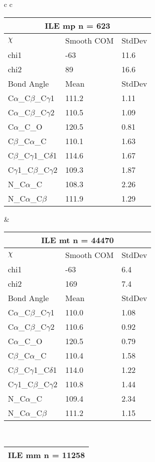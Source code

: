 \begin{longtable}{ c c }
\begin{tabular}{ l l l }
  \toprule
  \multicolumn{3}{c}{ILE \textbf{mp} n = 623} \\ \toprule
  $\chi$       & Smooth COM & StdDev \\ \midrule
  chi1 & -63 & 11.6 \\ 
  chi2 & 89 & 16.6 \\ \midrule
  Bond Angle   & Mean     & StdDev \\ \midrule
  C$\alpha$\_C$\beta$\_C$\gamma$1 & 111.2 & 1.11\\
  C$\alpha$\_C$\beta$\_C$\gamma$2 & 110.5 & 1.09\\
  C$\alpha$\_C\_O & 120.5 & 0.81\\
  C$\beta$\_C$\alpha$\_C & 110.1 & 1.63\\
  C$\beta$\_C$\gamma$1\_C$\delta$1 & 114.6 & 1.67\\
  C$\gamma$1\_C$\beta$\_C$\gamma$2 & 109.3 & 1.87\\
  N\_C$\alpha$\_C & 108.3 & 2.26\\
  N\_C$\alpha$\_C$\beta$ & 111.9 & 1.29\\
  \bottomrule
  \end{tabular}
  &
  \begin{tabular}{ l l l }
  \toprule
  \multicolumn{3}{c}{ILE \textbf{mt} n = 44470} \\ \toprule
  $\chi$       & Smooth COM & StdDev \\ \midrule
  chi1 & -63 & 6.4 \\ 
  chi2 & 169 & 7.4 \\ \midrule
  Bond Angle   & Mean     & StdDev \\ \midrule
  C$\alpha$\_C$\beta$\_C$\gamma$1 & 110.0 & 1.08\\
  C$\alpha$\_C$\beta$\_C$\gamma$2 & 110.6 & 0.92\\
  C$\alpha$\_C\_O & 120.5 & 0.79\\
  C$\beta$\_C$\alpha$\_C & 110.4 & 1.58\\
  C$\beta$\_C$\gamma$1\_C$\delta$1 & 114.0 & 1.22\\
  C$\gamma$1\_C$\beta$\_C$\gamma$2 & 110.8 & 1.44\\
  N\_C$\alpha$\_C & 109.4 & 2.34\\
  N\_C$\alpha$\_C$\beta$ & 111.2 & 1.15\\
  \bottomrule
  \end{tabular}
  \\
  \begin{tabular}{ l l l }
  \toprule
  \multicolumn{3}{c}{ILE \textbf{mm} n = 11258} \\ \toprule

\end{tabular}
\end{longtable}
